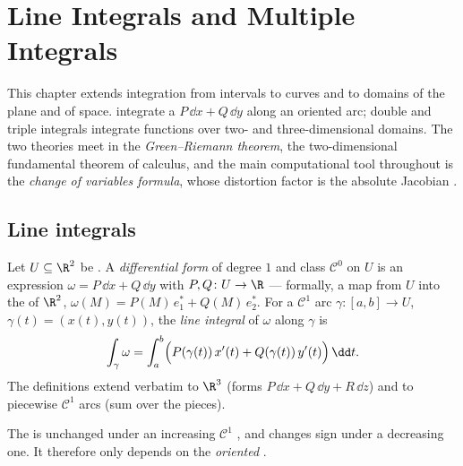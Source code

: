 \chapter{Line Integrals and Multiple Integrals}\label{ch:b2:multint}

This chapter extends integration from intervals to curves and to
domains of the plane and of space.  integrate a
\emph{} $P\,\dd x + Q\,\dd y$ along an oriented
arc; double and triple integrals integrate functions over
two- and three-dimensional domains. The two theories meet in the
\emph{Green--Riemann theorem}, the two-dimensional fundamental
theorem of calculus, and the main computational tool throughout is
the \emph{change of variables formula}, whose distortion factor is
the absolute Jacobian .

\section{Line integrals}

\begin{definition}\label{def:b2:multint:lineint}
Let $U \subseteq \R^2$ be . A \emph{differential
form} of
degree $1$ and class $\mathcal{C}^0$ on $U$ is an expression
$\omega = P\,\dd x + Q\,\dd y$ with $P, Q \colon U \to \R$
 --- formally, a  map from $U$ into the 
of $\R^2$, $\omega(M) = P(M)\,e_1^* + Q(M)\,e_2^*$. For a
$\mathcal{C}^1$ arc $\gamma \colon [a, b] \to U$, $\gamma(t) =
(x(t), y(t))$, the \emph{line integral} of
$\omega$ along $\gamma$
is
\[
\int_\gamma \omega
= \int_a^b \Bigl(P(\gamma(t))\,x'(t)
+ Q(\gamma(t))\,y'(t)\Bigr)\,\dd t .
\]
The definitions extend verbatim to $\R^3$ (forms $P\,\dd x +
Q\,\dd y + R\,\dd z$) and to piecewise $\mathcal{C}^1$ arcs (sum
over the pieces).
\end{definition}

\begin{proposition}\label{prop:b2:multint:lineinv}
The  is unchanged under an increasing $\mathcal{C}^1$
, and changes sign under a decreasing one. It
therefore only depends on the \emph{oriented} .
\end{proposition}

